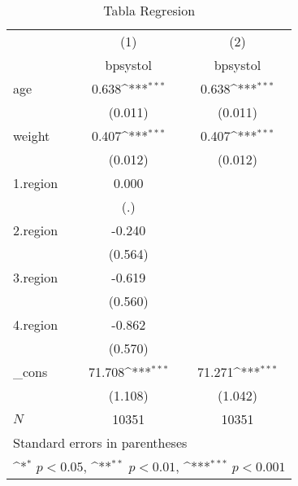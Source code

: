 \begin{table}[htbp]\centering
\def\sym#1{\ifmmode^{#1}\else\(^{#1}\)\fi}
\caption{Tabla Regresion}
\begin{tabular}{l*{2}{c}}
\toprule
            &\multicolumn{1}{c}{(1)}&\multicolumn{1}{c}{(2)}\\
            &\multicolumn{1}{c}{bpsystol}&\multicolumn{1}{c}{bpsystol}\\
\midrule
age         &       0.638\sym{***}&       0.638\sym{***}\\
            &     (0.011)         &     (0.011)         \\
\addlinespace
weight      &       0.407\sym{***}&       0.407\sym{***}\\
            &     (0.012)         &     (0.012)         \\
\addlinespace
1.region    &       0.000         &                     \\
            &         (.)         &                     \\
\addlinespace
2.region    &      -0.240         &                     \\
            &     (0.564)         &                     \\
\addlinespace
3.region    &      -0.619         &                     \\
            &     (0.560)         &                     \\
\addlinespace
4.region    &      -0.862         &                     \\
            &     (0.570)         &                     \\
\addlinespace
\_cons      &      71.708\sym{***}&      71.271\sym{***}\\
            &     (1.108)         &     (1.042)         \\
\midrule
\(N\)       &       10351         &       10351         \\
\bottomrule
\multicolumn{3}{l}{\footnotesize Standard errors in parentheses}\\
\multicolumn{3}{l}{\footnotesize \sym{*} \(p<0.05\), \sym{**} \(p<0.01\), \sym{***} \(p<0.001\)}\\
\end{tabular}
\end{table}
